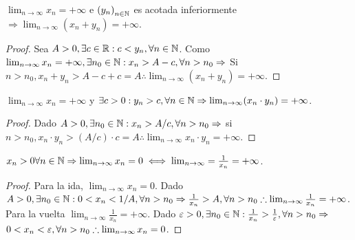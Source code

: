 \begin{prop}
  \(\lim_{n \to \infty} x_n = + \infty \) e \({(y_n)}_{n \in \mathbb{N}} \) es acotada inferiormente \(\Rightarrow \lim_{n \to \infty} (x_n + y_n) = +\infty\).
  \begin{proof}
    Sea \(A > 0, \exists c \in \mathbb{R} : c < y_n, \forall n \in \mathbb{N} \).
    Como \(\lim_{n \to \infty} x_n = + \infty, \exists n_0 \in \mathbb{N} : x_n > A - c, \forall n > n_0 \Rightarrow \)
    Si \(n > n_0, x_n + y_n > A - c + c = A \therefore \lim_{n \to \infty} (x_n + y_n) = +\infty\).
  \end{proof}
\end{prop}

\begin{prop}
  \(\lim_{n \to \infty} x_n = +\infty\) y \(\exists c > 0 : y_n > c, \forall n \in \mathbb{N} \Rightarrow \lim_{n \to \infty} (x_n \cdot y_n) = + \infty\).
  \begin{proof}
    Dado \(A > 0, \exists n_0 \in \mathbb{N} : x_n > A/c, \forall n > n_0 \Rightarrow \) si \(n > n_0, x_n \cdot y_n > (A/c) \cdot c = A \therefore \lim_{n \to \infty} x_n \cdot y_n = + \infty\).
  \end{proof}
\end{prop}

\begin{prop}
  \(x_n > 0 \forall n \in \mathbb{N} \Rightarrow \lim_{n \to \infty} x_n = 0 \iff \lim_{n \to \infty} = \frac{1}{x_n} = +\infty\).
  \begin{proof}
    Para la ida, \(\lim_{n \to \infty} x_n = 0\). Dado \(A > 0, \exists n_0 \in \mathbb{N} : 0 < x_n < 1/A, \forall n > n_0 \Rightarrow \frac{1}{x_n} > A, \forall n > n_0 \therefore \lim_{n \to \infty} \frac{1}{x_n} = +\infty\). \\
    Para la vuelta \(\lim_{n \to \infty} \frac{1}{x_n} = +\infty\). Dado \(\varepsilon > 0, \exists n_0 \in \mathbb{N} : \frac{1}{x_n} > \frac{1}{\varepsilon}, \forall n > n_0 \Rightarrow \) \\
    \(0 < x_n < \varepsilon, \forall n > n_0 \therefore \lim_{n \to \infty} x_n = 0\).
  \end{proof}
\end{prop}

